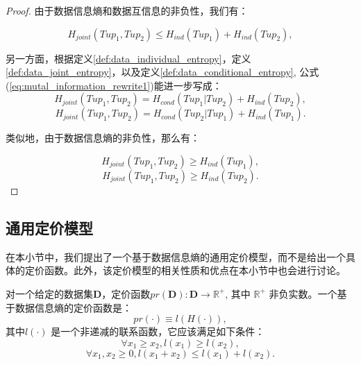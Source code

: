 \begin{propt}[不同数据信息熵之间的关系]
\begin{proof}
由于数据信息熵和数据互信息的非负性，我们有：

\begin{equation}
  H_{joint}(Tup_1,Tup_2)\le H_{ind}(Tup_1)+H_{ind}(Tup_2),
\end{equation}

另一方面，根据定义\ref{def:data_individual_entropy}，定义\ref{def:data_joint_entropy}，以及定义\ref{def:data_conditional_entropy}, 公式(\ref{eq:mutal_information_rewrite1})能进一步写成：
\begin{equation}
    H_{joint}(Tup_1,Tup_2)=H_{cond}(Tup_1|Tup_2)+H_{ind}(Tup_2),
\end{equation}
\begin{equation}
    H_{joint}(Tup_1,Tup_2)=H_{cond}(Tup_2|Tup_1)+H_{ind}(Tup_1).
\end{equation}

类似地，由于数据信息熵的非负性，那么有：

\begin{equation}
  H_{joint}(Tup_1,Tup_2)\ge H_{ind}(Tup_1),
\end{equation}
\begin{equation}
  H_{joint}(Tup_1,Tup_2)\ge H_{ind}(Tup_2).
\end{equation}

\end{proof}
\end{propt}


\subsection{通用定价模型}

在本小节中，我们提出了一个基于数据信息熵的通用定价模型，而不是给出一个具体的定价函数。此外，该定价模型的相关性质和优点在本小节中也会进行讨论。

\begin{defn}[定价函数]
对一个给定的数据集$\bm{D}$，定价函数${pr(\bm{D})}:\bm{D}\to \mathbb{R^{+}}$, 其中 $\mathbb{R^{+}}$ 非负实数。一个基于数据信息熵的定价函数是：
\begin{equation}
  pr(\cdot) \equiv l(H(\cdot)),
  \label{eq:pricing_function}
\end{equation}
其中$l(\cdot)$ 是一个非递减的联系函数，它应该满足如下条件：
\begin{equation}
\forall x_1 \ge x_2, l(x_1) \ge l(x_2),
\label{eq:link_function_property1}
\end{equation}
\begin{equation}
\forall x_1, x_2 \ge 0, l(x_1+x_2) \le l(x_1)+l(x_2).
\label{eq:link_function_property2}
\end{equation}
\end{defn}

